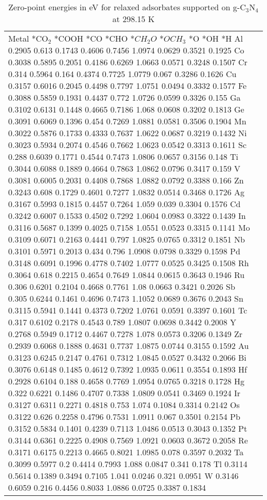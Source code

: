 \begin{table}[h]
    \centering
    \begin{tabular}{lr}
      \hline
      Metal	*CO$_2$	*COOH	*CO	*CHO	*$CH_2O$	*$OCH_3$	*O	*OH	*H
      \hline
      Al	0.2905	0.613 	0.1743	0.4606	0.7456	1.0974	0.0629	0.3521	0.1925
      Co	0.3038	0.5895	0.2051	0.4186	0.6269	1.0663	0.0571	0.3248	0.1507
      Cr	0.314 	0.5964	0.164	  0.4374	0.7725	1.0779	0.067	  0.3286	0.1626
      Cu	0.3157	0.6016	0.2045	0.4498	0.7797	1.0751	0.0494	0.3332	0.1577
      Fe	0.3088	0.5859	0.1931	0.4437	0.772 	1.0726	0.0599	0.3326	0.155
      Ga	0.3102	0.6131	0.1448	0.4665	0.7186	1.068 	0.0608	0.3202	0.1813
      Ge	0.3091	0.6069	0.1396	0.454	  0.7269	1.0881	0.0581	0.3506	0.1904
      Mn	0.3022	0.5876	0.1733	0.4333	0.7637	1.0622	0.0687	0.3219	0.1432
      Ni	0.3023	0.5934	0.2074	0.4546	0.7662	1.0623	0.0542	0.3313	0.1611
      Sc	0.288 	0.6039	0.1771	0.4544	0.7473	1.0806	0.0657	0.3156	0.148
      Ti	0.3044	0.6088	0.1889	0.4664	0.7863	1.0862	0.0796	0.3417	0.159
      V	  0.3081	0.6005	0.2031	0.4408	0.7868	1.0882	0.0792	0.3388	0.166
      Zn	0.3243	0.608 	0.1729	0.4601	0.7277	1.0832	0.0514	0.3468	0.1726
      Ag	0.3167	0.5993	0.1815	0.4457	0.7264	1.059	  0.039 	0.3304	0.1576
      Cd	0.3242	0.6007	0.1533	0.4502	0.7292	1.0604	0.0983	0.3322	0.1439
      In	0.3116	0.5687	0.1399	0.4025	0.7158	1.0551	0.0523	0.3315	0.1141
      Mo	0.3109	0.6071	0.2163	0.4441	0.797	  1.0825	0.0765	0.3312	0.1851
      Nb	0.3101	0.5971	0.2013	0.434 	0.796	  1.0908	0.0798	0.3329	0.1598
      Pd	0.3148	0.6091	0.1996	0.4778	0.7402	1.0777	0.0525	0.3425	0.1508
      Rh	0.3064	0.618	  0.2215	0.4654	0.7649	1.0844	0.0615	0.3643	0.1946
      Ru	0.306	  0.6201	0.2104	0.4668	0.7761	1.08	  0.0663	0.3421	0.2026
      Sb	0.305	  0.6244	0.1461	0.4696	0.7473	1.1052	0.0689	0.3676	0.2043
      Sn	0.3115	0.5941	0.1441	0.4373	0.7202	1.0761	0.0591	0.3397	0.1601
      Tc	0.317	  0.6102	0.2178	0.4543	0.789	  1.0807	0.0698	0.3442	0.2008
      Y	  0.2768	0.5949	0.1712	0.4467	0.7278	1.078	  0.0573	0.3206	0.1349
      Zr	0.2939	0.6068	0.1888	0.4631	0.7737	1.0875	0.0744	0.3155	0.1592
      Au	0.3123	0.6245	0.2147	0.4761	0.7312	1.0845	0.0527	0.3432	0.2066
      Bi	0.3076	0.6148	0.1485	0.4612	0.7392	1.0935	0.0611	0.3554	0.1893
      Hf	0.2928	0.6104	0.188	  0.4658	0.7769	1.0954	0.0765	0.3218	0.1728
      Hg	0.322	  0.6221	0.1486	0.4707	0.7338	1.0809	0.0541	0.3469	0.1924
      Ir	0.3127	0.6311	0.2271	0.4818	0.753 	1.074	  0.1084	0.3314	0.2142
      Os	0.3122	0.626 	0.2258	0.4796	0.7531	1.0911	0.067 	0.3501	0.2154
      Pb	0.3152	0.5834	0.1401	0.4239	0.7113	1.0486	0.0513	0.3043	0.1352
      Pt	0.3144	0.6361	0.2225	0.4908	0.7569	1.0921	0.0603	0.3672	0.2058
      Re	0.3171	0.6175	0.2213	0.4665	0.8021	1.0985	0.078	  0.3597	0.2032
      Ta	0.3099	0.5977	0.2	  	0.4414	0.7993	1.088	  0.0847	0.341	  0.178
      Tl	0.3114	0.5614	0.1389	0.3494	0.7105	1.041	  0.0246	0.321	  0.0951
      W	  0.3146	0.6059	0.216 	0.4456	0.8033	1.0886	0.0725	0.3387	0.1834
      \hline
    \end{tabular}
    \caption{Zero-point energies in eV for relaxed adsorbates supported on g-C$_3$N$_4$ at 298.15 K}
    \label{si_table7}
\end{table}


